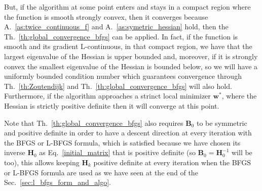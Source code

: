 \documentclass[11pt]{article}
\begin{document}
But, if the algorithm at some point enters and stays in a compact region where the function is smooth strongly convex, then it converges because A.~\ref{as:twice_continuous_f} and A.~\ref{as:symetric_hessian} hold, then the Th.~\ref{th:global_convergence_bfgs} can be applied. In fact, if the function is smooth and its gradient L-continuous, in that compact region, we have that the largest eigenvalue of the Hessian is upper bounded and, moreover, if it is  strongly convex the smallest eigenvalue of the Hessian is bounded below, so we will have a uniformly bounded condition number which guarantees convergence through Th.~\ref{th:Zoutendijk} and Th.~\ref{th:global_convergence_bfgs} will also hold. Furthermore, if the algorithm approaches a strinct local minimizer $\mathbf{w}^*$, where the Hessian is strictly positive definite then it will converge at this point.


Note that Th.~\ref{th:global_convergence_bfgs} also requires $\mathbf{B}_0$ to be symmetric and positive definite in order to have a descent direction at every iteration with the BFGS or L-BFGS formula, which is satisfied because we have chosen its inverse $\mathbf{H}_0$ as Eq.~\ref{initial_matrix} that is positive definite (so $\mathbf{B}_0 = \mathbf{H}^{-1}_0$ will be too), this allows keeping $\mathbf{H}_k$ positive definite at every iteration when the BFGS or L-BFGS formula are used as we have seen at the end of the Sec.~\ref{sec:l_bfgs_form_and_algo}.
\end{document}
